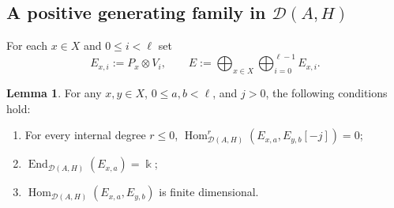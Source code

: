 \documentclass[11pt]{article}
\theoremstyle{definition}
\newtheorem{lem}[thm]{Lemma}
\numberwithin{equation}{section}
\newcommand{\kk}{\Bbbk}
\newcommand{\Hom}{\operatorname{Hom}}
\newcommand{\End}{\operatorname{End}}
\newcommand{\Der}{\mathcal{D}}
\begin{document}
\subsection{A positive generating family in
\texorpdfstring{$\Der(A,H)$}{D(A,H)}}\label{sec:positivity-general}
For each $x\in X$ and $0\le i<\ell$ set
\begin{equation}\label{eq:Exi}
E_{x,i}:=P_x\otimes V_i,
\qquad
E:=\bigoplus_{x\in X}\bigoplus_{i=0}^{\ell-1}E_{x,i} .
\end{equation}


\begin{lem}\label{lem:A-degree-general}
For any $x,y\in X$, $0\le a,b<\ell$, and $j>0$, the following conditions hold:
\begin{enumerate}
\item[(i)] For every internal degree $r\le0$,
$\Hom_{\Der(A,H)}^r(E_{x,a},E_{y,b}[-j])=0$;
\item[(ii)] $\End_{\Der(A,H)}(E_{x,a})=\kk$;
\item[(iii)] $\Hom_{\Der(A,H)}(E_{x,a},E_{y,b})$ is finite dimensional.
\end{enumerate}
\end{lem}
\end{document}
